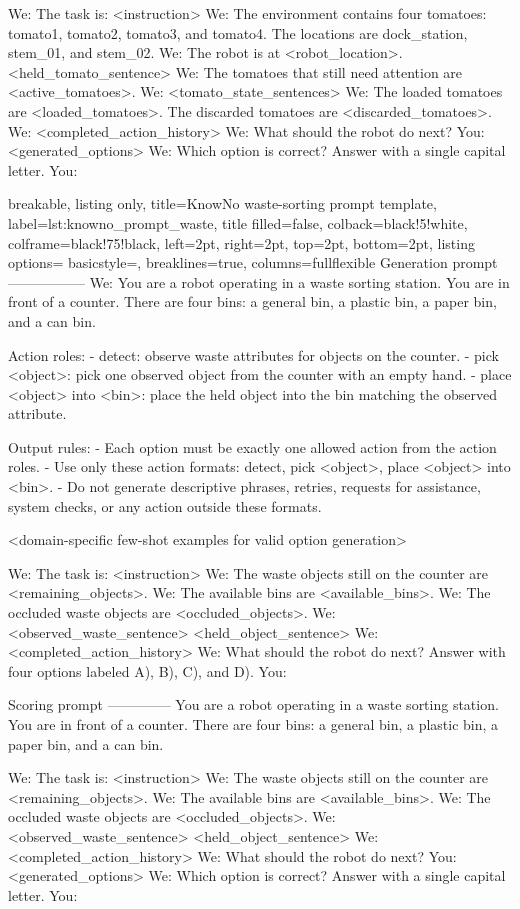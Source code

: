 \begin{tcblisting}
We: The task is: <instruction>
We: The environment contains four tomatoes: tomato1, tomato2, tomato3, and tomato4. The locations are dock_station, stem_01, and stem_02.
We: The robot is at <robot_location>. <held_tomato_sentence>
We: The tomatoes that still need attention are <active_tomatoes>.
We: <tomato_state_sentences>
We: The loaded tomatoes are <loaded_tomatoes>. The discarded tomatoes are <discarded_tomatoes>.
We: <completed_action_history>
We: What should the robot do next?
You:
<generated_options>
We: Which option is correct? Answer with a single capital letter.
You:
\end{tcblisting}

\begin{tcblisting}{
breakable,
listing only,
title=KnowNo waste-sorting prompt template,
label={lst:knowno_prompt_waste},
title filled=false,
colback=black!5!white,
colframe=black!75!black,
left=2pt,
right=2pt,
top=2pt,
bottom=2pt,
listing options={
basicstyle=\scriptsize\ttfamily,
breaklines=true,
columns=fullflexible
}}
Generation prompt
-----------------
We: You are a robot operating in a waste sorting station. You are in front of a counter. There are four bins: a general bin, a plastic bin, a paper bin, and a can bin.

Action roles:
- detect: observe waste attributes for objects on the counter.
- pick <object>: pick one observed object from the counter with an empty hand.
- place <object> into <bin>: place the held object into the bin matching the observed attribute.

Output rules:
- Each option must be exactly one allowed action from the action roles.
- Use only these action formats: detect, pick <object>, place <object> into <bin>.
- Do not generate descriptive phrases, retries, requests for assistance, system checks, or any action outside these formats.

<domain-specific few-shot examples for valid option generation>

We: The task is: <instruction>
We: The waste objects still on the counter are <remaining_objects>.
We: The available bins are <available_bins>.
We: The occluded waste objects are <occluded_objects>.
We: <observed_waste_sentence> <held_object_sentence>
We: <completed_action_history>
We: What should the robot do next? Answer with four options labeled A), B), C), and D).
You:

Scoring prompt
--------------
You are a robot operating in a waste sorting station. You are in front of a counter. There are four bins: a general bin, a plastic bin, a paper bin, and a can bin.

We: The task is: <instruction>
We: The waste objects still on the counter are <remaining_objects>.
We: The available bins are <available_bins>.
We: The occluded waste objects are <occluded_objects>.
We: <observed_waste_sentence> <held_object_sentence>
We: <completed_action_history>
We: What should the robot do next?
You:
<generated_options>
We: Which option is correct? Answer with a single capital letter.
You:
\end{tcblisting}

